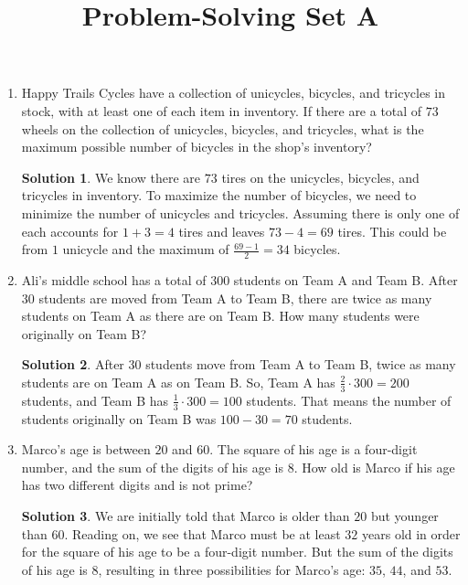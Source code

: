 \documentclass{article}
\title{Problem-Solving Set A}
\author{}
\date{}
\theoremstyle{definition}
\newtheorem*{solution}{Solution}
\begin{document}
\maketitle
\begin{multicols}{2}
    \begin{enumerate}
        \item Happy Trails Cycles have a collection of unicycles, bicycles, and tricycles in stock, with at least one of each item in inventory.
            If there are a total of $73$ wheels on the collection of unicycles, bicycles, and tricycles, what is the maximum possible number of bicycles in the shop's inventory?
            \begin{solution}
                We know there are $73$ tires on the unicycles, bicycles, and tricycles in inventory.
                To maximize the number of bicycles, we need to minimize the number of unicycles and tricycles.
                Assuming there is only one of each accounts for $1 + 3 = 4$ tires and leaves $73 - 4 = 69$ tires.
                This could be from $1$ unicycle and the maximum of $\frac{69 - 1}{2} = 34$ bicycles.
            \end{solution}
        \item Ali's middle school has a total of $300$ students on Team A and Team B.
            After $30$ students are moved from Team A to Team B, there are twice as many students on Team A as there are on Team B.
            How many students were originally on Team B?
            \begin{solution}
                After $30$ students move from Team A to Team B, twice as many students are on Team A as on Team B.
                So, Team A has $\frac{2}{3} \cdot 300 = 200$ students, and Team B has $\frac{1}{3} \cdot 300 = 100$ students.
                That means the number of students originally on Team B was $100 - 30 = 70$ students.
            \end{solution}
        \item Marco's age is between $20$ and $60$.
            The square of his age is a four-digit number, and the sum of the digits of his age is $8$.
            How old is Marco if his age has two different digits and is not prime?
            \begin{solution}
                We are initially told that Marco is older than $20$ but younger than $60$.
                Reading on, we see that Marco must be at least $32$ years old in order for the square of his age to be a four-digit number.
                But the sum of the digits of his age is $8$, resulting in three possibilities for Marco's age: $35$, $44$, and $53$.

\end{solution}
\end{enumerate}
\end{multicols}
\end{document}
